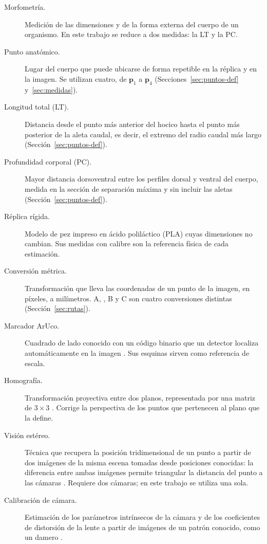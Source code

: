 \begin{description}
  \item[Morfometría.] Medición de las dimensiones y de la forma externa del cuerpo de un organismo. En este trabajo se reduce a dos medidas: la LT y la PC.
  \item[Punto anatómico.] Lugar del cuerpo que puede ubicarse de forma repetible en la réplica y en la imagen. Se utilizan cuatro, de $\mathbf{p}_1$ a $\mathbf{p}_4$ (Secciones~\ref{sec:puntos-def} y~\ref{sec:medidas}).
  \item[Longitud total (LT).] Distancia desde el punto más anterior del hocico hasta el punto más posterior de la aleta caudal, es decir, el extremo del radio caudal más largo (Sección~\ref{sec:puntos-def}).
  \item[Profundidad corporal (PC).] Mayor distancia dorsoventral entre los perfiles dorsal y ventral del cuerpo, medida en la sección de separación máxima y sin incluir las aletas (Sección~\ref{sec:puntos-def}).
  \item[Réplica rígida.] Modelo de pez impreso en ácido poliláctico (PLA) cuyas dimensiones no cambian. Sus medidas con calibre son la referencia física de cada estimación.
  \item[Conversión métrica.] Transformación que lleva las coordenadas de un punto de la imagen, en píxeles, a milímetros. A, \Aprime, B y C son cuatro conversiones distintas (Sección~\ref{sec:rutas}).
  \item[Marcador ArUco.] Cuadrado de lado conocido con un código binario que un detector localiza automáticamente en la imagen \parencite{GarridoJurado2014}. Sus esquinas sirven como referencia de escala.
  \item[Homografía.] Transformación proyectiva entre dos planos, representada por una matriz de $3 \times 3$ \parencite{Hartley2004}. Corrige la perspectiva de los puntos que pertenecen al plano que la define.
  \item[Visión estéreo.] Técnica que recupera la posición tridimensional de un punto a partir de dos imágenes de la misma escena tomadas desde posiciones conocidas: la diferencia entre ambas imágenes permite triangular la distancia del punto a las cámaras \parencite{Hartley2004}. Requiere dos cámaras; en este trabajo se utiliza una sola.
  \item[Calibración de cámara.] Estimación de los parámetros intrínsecos de la cámara y de los coeficientes de distorsión de la lente a partir de imágenes de un patrón conocido, como un damero \parencite{Zhang2000}.

\end{description}
